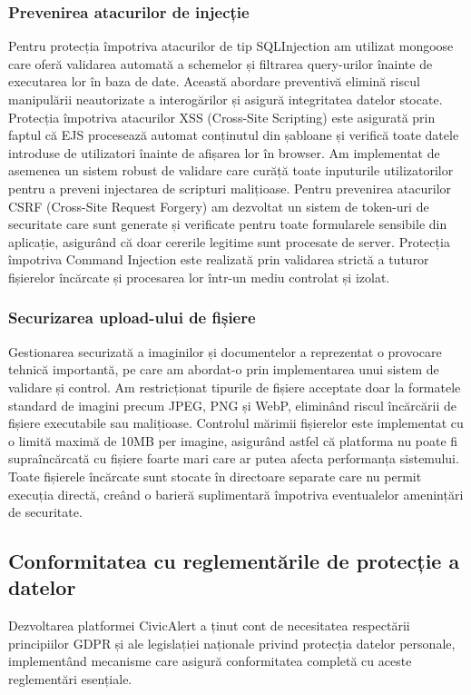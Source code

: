 \documentclass[12pt,a4paper]{report}
\begin{document}
\subsubsection{Prevenirea atacurilor de injecție}
Pentru protecția împotriva atacurilor de tip SQLInjection am utilizat mongoose care oferă validarea automată a schemelor și filtrarea query-urilor înainte de executarea lor în baza de date. Această abordare preventivă elimină riscul manipulării neautorizate a interogărilor și asigură integritatea datelor stocate.
Protecția împotriva atacurilor XSS (Cross-Site Scripting) este asigurată prin faptul că EJS procesează automat conținutul din șabloane și verifică toate datele introduse de utilizatori înainte de afișarea lor în browser. Am implementat de asemenea un sistem robust de validare care curăță toate inputurile utilizatorilor pentru a preveni injectarea de scripturi malițioase.
Pentru prevenirea atacurilor CSRF (Cross-Site Request Forgery) am dezvoltat un sistem de token-uri de securitate care sunt generate și verificate pentru toate formularele sensibile din aplicație, asigurând că doar cererile legitime sunt procesate de server. Protecția împotriva Command Injection este realizată prin validarea strictă a tuturor fișierelor încărcate și procesarea lor într-un mediu controlat și izolat.
\subsubsection{Securizarea upload-ului de fișiere}
Gestionarea securizată a imaginilor și documentelor a reprezentat o provocare tehnică importantă, pe care am abordat-o prin implementarea unui sistem  de validare și control. Am restricționat tipurile de fișiere acceptate doar la formatele standard de imagini precum JPEG, PNG și WebP, eliminând riscul încărcării de fișiere executabile sau malițioase.
Controlul mărimii fișierelor este implementat cu o limită maximă de 10MB per imagine, asigurând astfel că platforma nu poate fi supraîncărcată cu fișiere foarte mari care ar putea afecta performanța sistemului. Toate fișierele încărcate sunt stocate în directoare separate care nu permit execuția directă, creând o barieră suplimentară împotriva eventualelor amenințări de securitate.
\subsection{Conformitatea cu reglementările de protecție a datelor}
Dezvoltarea platformei CivicAlert a ținut cont de necesitatea respectării principiilor GDPR și ale legislației naționale privind protecția datelor personale, implementând mecanisme care asigură conformitatea completă cu aceste reglementări esențiale.
\end{document}
